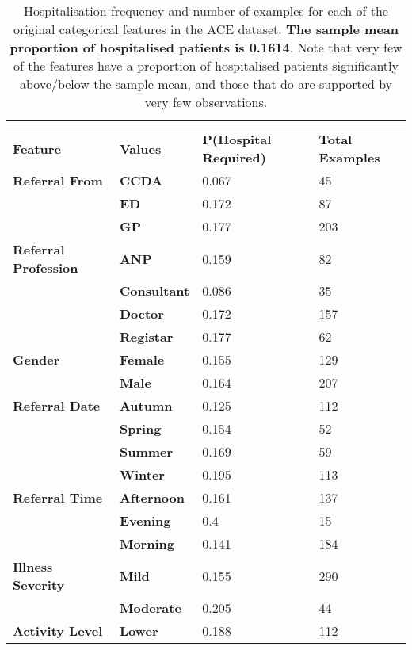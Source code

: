 \scriptsize{
\begin{longtable}[c]{P{30mm}P{20mm}P{15mm}P{15mm}}
    \caption[Hospitalisation frequency and number of examples for each of the original categorical features in the ACE dataset]{Hospitalisation frequency and number of examples for each of the original categorical features in the ACE dataset. \textbf{The sample mean proportion of hospitalised patients is 0.1614}. Note that very few of the features have a proportion of hospitalised patients significantly above/below the sample mean, and those that do are supported by very few observations.}\\
    \label{tab:cat-feature-hosp-freqs}\\
    \toprule
    \textbf{Feature} & \textbf{Values} & \textbf{P(Hospital Required)} & \textbf{Total Examples} \\\toprule
    \endfirsthead
    \endhead
    \textbf{Referral From} & \textbf{CCDA} & 0.067 & 45 \\*
    & \textbf{ED} & 0.172 & 87 \\*
    & \textbf{GP} & 0.177 & 203 \\[3mm]
    \textbf{Referral Profession} & \textbf{ANP} & 0.159 & 82 \\*
    & \textbf{Consultant}  & 0.086 & 35 \\*
    & \textbf{Doctor} & 0.172 & 157 \\*
    & \textbf{Registar} & 0.177 & 62 \\[3mm]
    \textbf{Gender} & \textbf{Female} & 0.155 & 129 \\*
    & \textbf{Male} & 0.164 & 207 \\[3mm]
    \textbf{Referral Date} & \textbf{Autumn} & 0.125 & 112 \\*
    & \textbf{Spring} & 0.154 & 52 \\*
    & \textbf{Summer} & 0.169 & 59 \\*
    & \textbf{Winter} & 0.195 & 113 \\[3mm]
    \textbf{Referral Time} & \textbf{Afternoon} & 0.161 & 137 \\*
    & \textbf{Evening} & 0.4 & 15 \\*
    & \textbf{Morning} & 0.141 & 184 \\[3mm]
    \textbf{Illness Severity} & \textbf{Mild} & 0.155 & 290 \\*
    & \textbf{Moderate} & 0.205 & 44 \\[3mm]
    \textbf{Activity Level} & \textbf{Lower} & 0.188 & 112 \\*

\end{longtable}}
